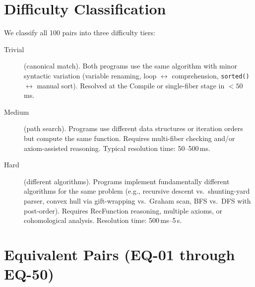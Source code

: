 \documentclass[11pt,a4paper]{report}
\theoremstyle{definition}
\theoremstyle{plain}
\begin{document}
\section{Difficulty Classification}

We classify all 100 pairs into three difficulty tiers:

\begin{description}
  \item[Trivial] (canonical match).
    Both programs use the same algorithm with minor syntactic
    variation (variable renaming, loop $\leftrightarrow$
    comprehension, \texttt{sorted()} $\leftrightarrow$ manual sort).
    Resolved at the Compile or single-fiber stage in $< 50$\,ms.

  \item[Medium] (path search).
    Programs use different data structures or iteration orders but
    compute the same function.  Requires multi-fiber checking and/or
    axiom-assisted reasoning.  Typical resolution time: 50--500\,ms.

  \item[Hard] (different algorithms).
    Programs implement fundamentally different algorithms for the
    same problem (e.g., recursive descent vs.\ shunting-yard parser,
    convex hull via gift-wrapping vs.\ Graham scan, BFS vs.\ DFS
    with post-order).  Requires RecFunction reasoning, multiple
    axioms, or cohomological analysis.  Resolution time: 500\,ms--5\,s.
\end{description}

\section{Equivalent Pairs (EQ-01 through EQ-50)}
\end{document}

